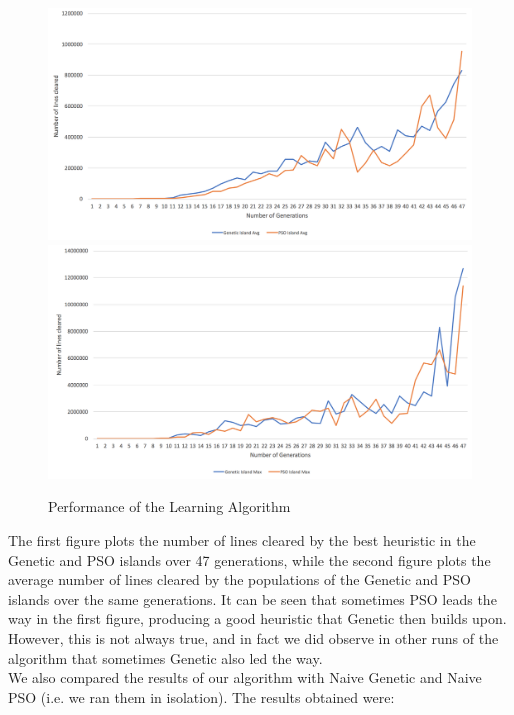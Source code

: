 \documentclass[12pt]{article}
\begin{document}
	\begin{figure}[h]
		\includegraphics[scale=0.28]{learning/AlgoMax}
		\includegraphics[scale=0.28]{learning/AlgoAvg}
		\centering
		\caption{Performance of the Learning Algorithm}
		\label{fig:learning}
	\end{figure}

	The first figure plots the number of lines cleared by the best heuristic in
	the Genetic and PSO islands over 47 generations, while the second figure plots
	the average number of lines cleared by the populations of the Genetic and PSO
	islands over the same generations. It can be seen that sometimes PSO leads the
	way in the first figure, producing a good heuristic that Genetic then builds
	upon. However, this is not always true, and in fact we did observe in other
	runs of the algorithm that sometimes Genetic also led the way.\\
	We also compared the results of our algorithm with Naive Genetic and Naive PSO
	(i.e. we ran them in isolation). The results obtained were:
\end{document}
